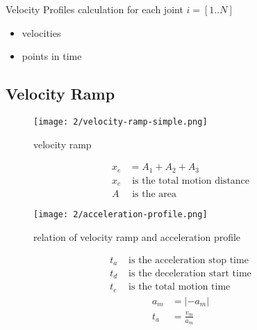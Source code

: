 \documentclass[%
  professionalfonts,%
  xcolor={%
    usenames,%
    dvipsnames,%
    svgnames,%
    table,%
    hyperref%
  }%
]{beamer}
\begin{document}
\begin{frame}{Velocity Profiles}
calculation for each joint $i=[1..N]$
	\begin{itemize}
		\item velocities
		\item points in time
	\end{itemize}

\end{frame}

\subsection{Velocity Ramp}
\begin{frame}
\begin{figure}[h]
  \texttt{[image: 2/velocity-ramp-simple.png]}
  \caption{velocity ramp}
  \label{fig:velocity-ramp-simple}
\end{figure}
\begin{align*}
x_{e} & = A_{1} + A_{2} + A_{3} \\
x_{e} & \text{ is the total motion distance} \\
A & \text{ is the area}
\end{align*}
\end{frame}

\begin{frame}
	\begin{figure}[h]
		\texttt{[image: 2/acceleration-profile.png]}
		\caption{relation of velocity ramp and acceleration profile}
		\label{fig:acceleration-profile}
	\end{figure}
		\begin{align*} %
		t_{a} & \text{ is the acceleration stop time} \\
		t_{d} & \text{ is the deceleration start time} \\
		t_{e} & \text{ is the total motion time}
		\end{align*}
		\begin{align*}
		a_{m} & = \lvert -a_{m} \rvert \\
		t_{a} & = \frac{v_{m}}{a_{m}}
		\end{align*}
\end{frame}
\end{document}
